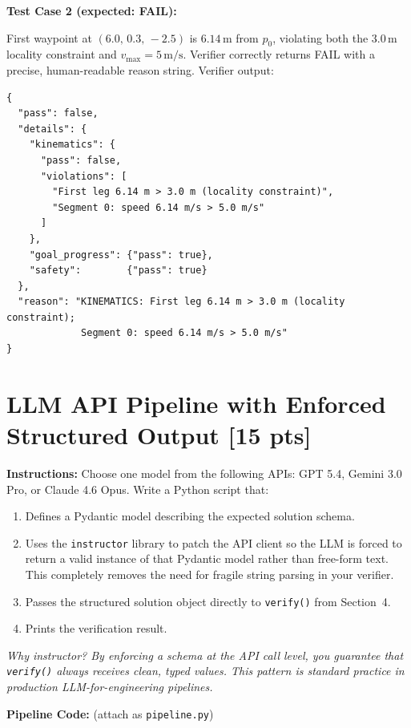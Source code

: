 \documentclass[12pt]{article}
\begin{document}
\medskip
\noindent\textbullet\quad\textbf{Test Case 2 (expected: FAIL):}

\medskip
First waypoint at $(6.0,\,0.3,\,-2.5)$ is $6.14\,\text{m}$ from $p_0$, violating both the
$3.0\,\text{m}$ locality constraint and $v_{\max} = 5\,\text{m/s}$. Verifier correctly returns
FAIL with a precise, human-readable reason string. Verifier output:

\begin{lstlisting}[style=jsoncode]
{
  "pass": false,
  "details": {
    "kinematics": {
      "pass": false,
      "violations": [
        "First leg 6.14 m > 3.0 m (locality constraint)",
        "Segment 0: speed 6.14 m/s > 5.0 m/s"
      ]
    },
    "goal_progress": {"pass": true},
    "safety":        {"pass": true}
  },
  "reason": "KINEMATICS: First leg 6.14 m > 3.0 m (locality constraint);
             Segment 0: speed 6.14 m/s > 5.0 m/s"
}
\end{lstlisting}

\newpage
\section{LLM API Pipeline with Enforced Structured Output [15 pts]}

\noindent\textbf{Instructions:} Choose one model from the following APIs: GPT 5.4, Gemini
3.0 Pro, or Claude 4.6 Opus. Write a Python script that:
\begin{enumerate}
  \item Defines a Pydantic model describing the expected solution schema.
  \item Uses the \texttt{instructor} library to patch the API client so the LLM is forced to
    return a valid instance of that Pydantic model rather than free-form text. This completely
    removes the need for fragile string parsing in your verifier.
  \item Passes the structured solution object directly to \texttt{verify()} from Section~4.
  \item Prints the verification result.
\end{enumerate}
\textit{Why instructor? By enforcing a schema at the API call level, you guarantee that
\texttt{verify()} always receives clean, typed values. This pattern is standard practice in
production LLM-for-engineering pipelines.}

\bigskip
\noindent\textbf{Pipeline Code:} (attach as \texttt{pipeline.py})
\end{document}

